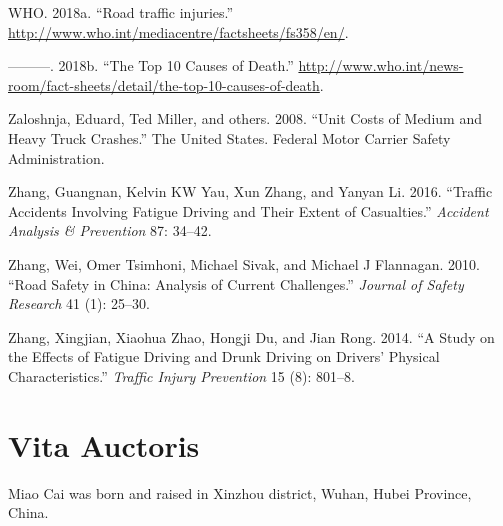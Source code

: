 \documentclass[12pt]{book}
\numberwithin{equation}{chapter}
\begin{document}
\leavevmode\hypertarget{ref-who2018b}{}%
WHO. 2018a. ``Road traffic injuries.'' \url{http://www.who.int/mediacentre/factsheets/fs358/en/}.

\leavevmode\hypertarget{ref-who2018}{}%
---------. 2018b. ``The Top 10 Causes of Death.'' \url{http://www.who.int/news-room/fact-sheets/detail/the-top-10-causes-of-death}.

\leavevmode\hypertarget{ref-zaloshnja2008unit}{}%
Zaloshnja, Eduard, Ted Miller, and others. 2008. ``Unit Costs of Medium and Heavy Truck Crashes.'' The United States. Federal Motor Carrier Safety Administration.

\leavevmode\hypertarget{ref-zhang2016traffic}{}%
Zhang, Guangnan, Kelvin KW Yau, Xun Zhang, and Yanyan Li. 2016. ``Traffic Accidents Involving Fatigue Driving and Their Extent of Casualties.'' \emph{Accident Analysis \& Prevention} 87: 34--42.

\leavevmode\hypertarget{ref-zhang2010road}{}%
Zhang, Wei, Omer Tsimhoni, Michael Sivak, and Michael J Flannagan. 2010. ``Road Safety in China: Analysis of Current Challenges.'' \emph{Journal of Safety Research} 41 (1): 25--30.

\leavevmode\hypertarget{ref-zhang2014study}{}%
Zhang, Xingjian, Xiaohua Zhao, Hongji Du, and Jian Rong. 2014. ``A Study on the Effects of Fatigue Driving and Drunk Driving on Drivers' Physical Characteristics.'' \emph{Traffic Injury Prevention} 15 (8): 801--8.

\hypertarget{vita-auctoris}{%
\chapter*{Vita Auctoris}\label{vita-auctoris}}

Miao Cai was born and raised in Xinzhou district, Wuhan, Hubei Province, China.







\backmatter
\printindex
\end{document}
